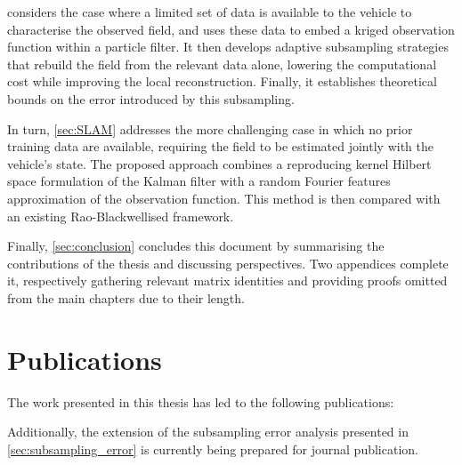  considers the case where a limited set of data is available to the vehicle to characterise the observed field, and uses these data to embed a kriged observation function within a particle filter. It then develops adaptive subsampling strategies that rebuild the field from the relevant data alone, lowering the computational cost while improving the local reconstruction. Finally, it establishes theoretical bounds on the error introduced by this subsampling.

In turn, \cref{sec:SLAM} addresses the more challenging case in which no prior training data are available, requiring the field to be estimated jointly with the vehicle's state. The proposed approach combines a reproducing kernel Hilbert space formulation of the Kalman filter with a random Fourier features approximation of the observation function. This method is then compared with an existing Rao-Blackwellised framework.

Finally, \cref{sec:conclusion} concludes this document by summarising the contributions of the thesis and discussing perspectives. Two appendices complete it, respectively gathering relevant matrix identities and providing proofs omitted from the main chapters due to their length.

\section{Publications}

The work presented in this thesis has led to the following publications:

\begin{refsection}
	\nocite{bib:AK-PF,bib:AK-PF-clustered,bib:RFF-KKF-SLAM}
	\printbibliography[heading=none]
\end{refsection}

Additionally, the extension of the subsampling error analysis presented in \cref{sec:subsampling_error} is currently being prepared for journal publication.
